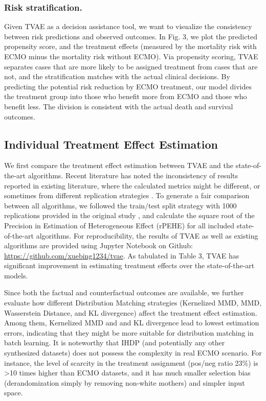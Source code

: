 \subsubsection{Risk stratification.} Given TVAE as a decision assistance tool, we want to visualize the consistency between risk predictions and observed outcomes. In Fig. 3, we plot the predicted propensity score, and the treatment effects (measured by the mortality risk with ECMO minus the mortality risk without ECMO). Via propensity scoring, TVAE separates cases that are more likely to be assigned treatment from cases that are not, and the stratification matches with the actual clinical decisions. By predicting the potential risk reduction by ECMO treatment, our model divides the treatment group into those who benefit more from ECMO and those who benefit less. The division is consistent with the actual death and survival outcomes.



% 




\subsection{Individual Treatment Effect Estimation}

We first compare the treatment effect estimation between TVAE and the state-of-the-art algorithms. Recent literature has noted the inconsistency of results reported in existing literature, where the calculated metrics might be different, or sometimes from different replication strategies \cite{curth2021really}. To generate a fair comparison between all algorithms, we followed the train/test split strategy with 1000 replications provided in the original study \cite{louizos2017cevae}, and calculate the square root of the Precision in Estimation of Heterogeneous Effect (rPEHE) for all included state-of-the-art algorithms.
For reproducibility, the results of TVAE as well as existing algorithms are provided using Jupyter Notebook on Github: \url{https://github.com/xuebing1234/tvae}. As tabulated in Table 3, TVAE has significant improvement in estimating treatment effects over the state-of-the-art models. 

Since both the factual and counterfactual outcomes are available, we further evaluate how different Distribution Matching strategies (Kernelized MMD, MMD, Wasserstein Distance, and KL divergence) affect the treatment effect estimation. Among them, Kernelized MMD and and KL divergence lead to lowest estimation errors, indicating that they might be more suitable for distribution matching in batch learning. 
It is noteworthy that IHDP (and potentially any other synthesized datasets) does not possess the complexity in real ECMO scenario. For instance, the level of scarcity in the treatment assignment (pos/neg ratio 23\%) is >10 times higher than ECMO datasets, and it has much smaller selection bias (derandomization simply by removing non-white mothers) and simpler input space. 

